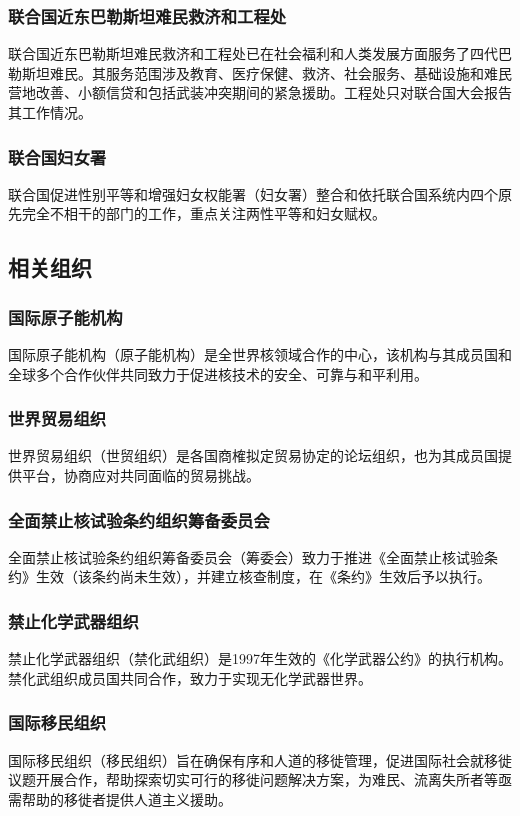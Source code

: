\documentclass[a4paper,openany]{book}
\begin{document}
\subsubsection{联合国近东巴勒斯坦难民救济和工程处}
联合国近东巴勒斯坦难民救济和工程处已在社会福利和人类发展方面服务了四代巴勒斯坦难民。其服务范围涉及教育、医疗保健、救济、社会服务、基础设施和难民营地改善、小额信贷和包括武装冲突期间的紧急援助。工程处只对联合国大会报告其工作情况。

\subsubsection{联合国妇女署}
联合国促进性别平等和增强妇女权能署（妇女署）整合和依托联合国系统内四个原先完全不相干的部门的工作，重点关注两性平等和妇女赋权。

\subsection{相关组织}

\subsubsection{国际原子能机构}
国际原子能机构（原子能机构）是全世界核领域合作的中心，该机构与其成员国和全球多个合作伙伴共同致力于促进核技术的安全、可靠与和平利用。

\subsubsection{世界贸易组织}
世界贸易组织（世贸组织）是各国商榷拟定贸易协定的论坛组织，也为其成员国提供平台，协商应对共同面临的贸易挑战。

\subsubsection{全面禁止核试验条约组织筹备委员会}
全面禁止核试验条约组织筹备委员会（筹委会）致力于推进《全面禁止核试验条约》生效（该条约尚未生效），并建立核查制度，在《条约》生效后予以执行。

\subsubsection{禁止化学武器组织}
禁止化学武器组织（禁化武组织）是1997年生效的《化学武器公约》的执行机构。禁化武组织成员国共同合作，致力于实现无化学武器世界。

\subsubsection{国际移民组织}
国际移民组织（移民组织）旨在确保有序和人道的移徙管理，促进国际社会就移徙议题开展合作，帮助探索切实可行的移徙问题解决方案，为难民、流离失所者等亟需帮助的移徙者提供人道主义援助。
\end{document}
